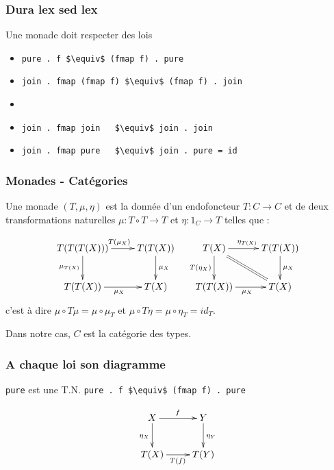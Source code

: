 \documentclass{beamer}
\begin{document}
\begin{frame}
\frametitle{Dura lex sed lex}
\begin{alertblock}{Une monade doit respecter des lois}
\begin{itemize}
\item \verb!pure . f $\equiv$ (fmap f) . pure!
\item \verb!join . fmap (fmap f) $\equiv$ (fmap f) . join!
\item[] \ 
\item \verb!join . fmap join   $\equiv$ join . join!
\item \verb!join . fmap pure   $\equiv$ join . pure = id!
\end{itemize}
\end{alertblock}
\end{frame}

\begin{frame}
\frametitle{Monades - Catégories}
Une monade $(T, \mu, \eta)$ est la donnée d'un
endofoncteur $T : C \rightarrow C$ et de deux
transformations naturelles $\mu : T\circ T \rightarrow T$ et $\eta : 1_C \rightarrow T$ telles que :

\[
\begin{array}{cc}
\xymatrix{
T(T(T(X))) \ar[r]^{T(\mu_X)} \ar[d]_{\mu_{T(X)}} & T(T(X)) \ar[d]^{\mu_X} \\
T(T(X)) \ar[r]_{\mu_X} & T(X) \\
}
&
\xymatrix{
T(X) \ar[r]^{\eta_{T(X)}} \ar[d]_{T(\eta_X)}  \ar@{=}[dr] & T(T(X)) \ar[d]^{\mu_X} \\
T(T(X)) \ar[r]_{\mu_X} & T(X) \\
}
\end{array}
\]
c'est à dire
$\mu \circ T\mu = \mu \circ \mu_T$
et
$\mu \circ T \eta = \mu \circ \eta_T = id_T$.

\pause

Dans notre cas, $C$ est la catégorie des types.
\end{frame}

\begin{frame}
\frametitle{A chaque loi son diagramme}
\begin{alertblock}{\verb!pure! est une T.N.}
\verb!pure . f $\equiv$ (fmap f) . pure!
\end{alertblock}

\begin{block}{}
\[
\xymatrix{
X \ar[r]^{f} \ar[d]_{\eta_X} & Y \ar[d]^{\eta_Y} \\
T(X) \ar[r]_{T(f)} & T(Y) \\
}
\]
\end{block}

\end{frame}
\end{document}
